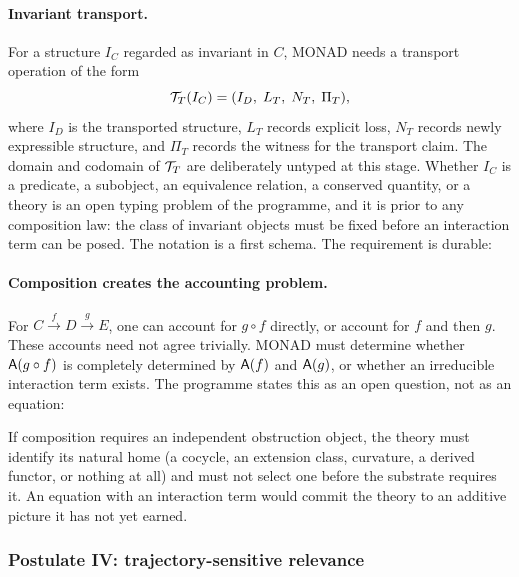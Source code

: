 \paragraph{Invariant transport.}

For a structure $I_C$ regarded as invariant in $C$, MONAD needs a
transport operation of the form
\begin{equation}
  \mathcal{T}_T(I_C) = (I_D,\; L_T,\; N_T,\; \Pi_T),\label{eq:transport}
\end{equation}
where $I_D$ is the transported structure, $L_T$ records explicit loss,
$N_T$ records newly expressible structure, and $\Pi_T$ records the
witness for the transport claim. The domain and codomain of
$\mathcal{T}_T$ are deliberately untyped at this stage. Whether $I_C$
is a predicate, a subobject, an equivalence relation, a conserved
quantity, or a theory is an open typing problem of the programme, and
it is prior to any composition law: the class of invariant objects
must be fixed before an interaction term can be posed. The notation is
a first schema. The requirement is durable:


\paragraph{Composition creates the accounting problem.}

For $C \xrightarrow{f} D \xrightarrow{g} E$, one can account for
$g \circ f$ directly, or account for $f$ and then $g$. These accounts
need not agree trivially. MONAD must determine whether
$\mathsf{A}(g \circ f)$ is completely determined by $\mathsf{A}(f)$ and
$\mathsf{A}(g)$, or whether an irreducible interaction term exists. The
programme states this as an open question, not as an equation:


If composition requires an independent obstruction object, the theory
must identify its natural home (a cocycle, an extension class,
curvature, a derived functor, or nothing at all) and must not select
one before the substrate requires it. An equation with an interaction
term would commit the theory to an additive picture it has not yet
earned.

\subsubsection{Postulate IV: trajectory-sensitive relevance}\label{ss:trajectory-relevance}

